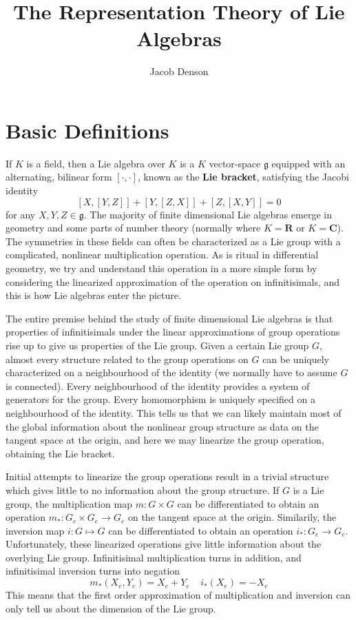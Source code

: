 

\title{The Representation Theory of Lie Algebras}
\author{Jacob Denson}




\maketitle

\tableofcontents


\chapter{Basic Definitions}

If $K$ is a field, then a Lie algebra over $K$ is a $K$ vector-space $\mathfrak{g}$ equipped with an alternating, bilinear form $[\cdot, \cdot]$, known as the {\bf Lie bracket}, satisfying the Jacobi identity
%
\[ [X,[Y,Z]] + [Y,[Z,X]] + [Z,[X,Y]] = 0 \]
%
for any $X,Y,Z \in \mathfrak{g}$. The majority of finite dimensional Lie algebras emerge in geometry and some parts of number theory (normally where $K = \mathbf{R}$ or $K = \mathbf{C}$). The symmetries in these fields can often be characterized as a Lie group with a complicated, nonlinear multiplication operation. As is ritual in differential geometry, we try and understand this operation in a more simple form by considering the linearized approximation of the operation on infinitisimals, and this is how Lie algebras enter the picture.

The entire premise behind the study of finite dimensional Lie algebras is that properties of infinitisimals under the linear approximations of group operations rise up to give us properties of the Lie group. Given a certain Lie group $G$, almost every structure related to the group operations on $G$ can be uniquely characterized on a neighbourhood of the identity (we normally have to assume $G$ is connected). Every neighbourhood of the identity provides a system of generators for the group. Every homomorphism is uniquely specified on a neighbourhood of the identity. This tells us that we can likely maintain most of the global information about the nonlinear group structure as data on the tangent space at the origin, and here we may linearize the group operation, obtaining the Lie bracket.

Initial attempts to linearize the group operations result in a trivial structure which gives little to no information about the group structure. If $G$ is a Lie group, the multiplication map $m: G \times G$ can be differentiated to obtain an operation $m_*: G_e \times G_e \to G_e$ on the tangent space at the origin. Similarily, the inversion map $i: G \mapsto G$ can be differentiated to obtain an operation $i_*: G_e \to G_e$. Unfortunately, these linearized operations give little information about the overlying Lie group. Infinitisimal multiplication turns in addition, and infinitisimal inversion turns into negation
%
\[ m_*(X_e, Y_e) = X_e + Y_e\ \ \ \ \ i_*(X_e) = -X_e \]
%
This means that the first order approximation of multiplication and inversion can only tell us about the dimension of the Lie group.

